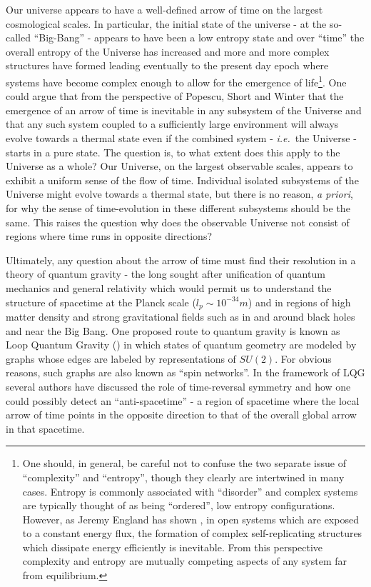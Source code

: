 \documentclass[preprint]{SciPost}
\newcommand{\ie}{\textit{i.e.}~}
\theoremstyle{plain} %
\begin{document}
Our universe appears to have a well-defined arrow of time on the largest cosmological scales. In particular, the initial state of the universe - at the so-called ``Big-Bang'' - appears to have been a low entropy state and over ``time'' the overall entropy of the Universe has increased and more and more complex structures have formed leading eventually to the present day epoch where systems have become complex enough to allow for the emergence of life\footnote{One should, in general, be careful not to confuse the two separate issue of ``complexity'' and ``entropy'', though they clearly are intertwined in many cases. Entropy is commonly associated with ``disorder'' and complex systems are typically thought of as being ``ordered'', low entropy configurations. However, as Jeremy England has shown \cite{England2012Statistical}, in open systems which are exposed to a constant energy flux, the formation of complex self-replicating structures which dissipate energy efficiently is inevitable. From this perspective complexity and entropy are mutually competing aspects of any system far from equilibrium.}. One could argue that from the perspective of Popescu, Short and Winter \cite{Popescu2006Entanglement} that the emergence of an arrow of time is inevitable in any subsystem of the Universe and that any such system coupled to a sufficiently large environment will always evolve towards a thermal state even if the combined system - \ie the Universe - starts in a pure state. The question is, to what extent does this apply to the Universe as a whole? Our Universe, on the largest observable scales, appears to exhibit a uniform sense of the flow of time. Individual isolated subsystems of the Universe might evolve towards a thermal state, but there is no reason, \emph{a priori}, for why the sense of time-evolution in these different subsystems should be the same. This raises the question why does the observable Universe not consist of regions where time runs in opposite directions? 

Ultimately, any question about the arrow of time must find their resolution in a theory of quantum gravity - the long sought after unification of quantum mechanics and general relativity which would permit us to understand the structure of spacetime at the Planck scale ($ l_p \sim 10^{-34}m $) and in regions of high matter density and strong gravitational fields such as in and around black holes and near the Big Bang. One proposed route to quantum gravity is known as Loop Quantum Gravity (\cite{Vaid2016LQG-for-the-Bewildered}) in which states of quantum geometry are modeled by graphs whose edges are labeled by representations of $ SU(2) $. For obvious reasons, such graphs are also known as ``spin networks''. In the framework of LQG several authors have discussed the role of time-reversal symmetry \cite{Christodoulou2012How-to-detect,Rovelli2012Discrete} and how one could possibly detect an ``anti-spacetime'' - a region of spacetime where the local arrow of time points in the opposite direction to that of the overall global arrow in that spacetime.
\end{document}
